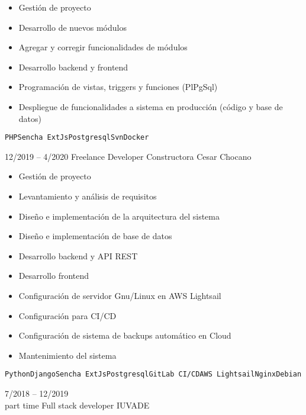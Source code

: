 \begin{entrylist}
{\begin{itemize}
    	        \item Gestión de proyecto
    	        \item Desarrollo de nuevos módulos
    	        \item Agregar y corregir funcionalidades de módulos
    	        \item Desarrollo backend y frontend
    	        \item Programación de vistas, triggers y funciones (PlPgSql)
    	        \item Despliegue de funcionalidades a sistema en producción (código y base de datos)
    	    \end{itemize}
		    \texttt{PHP}\slashsep\texttt{Sencha ExtJs}\slashsep\texttt{Postgresql}\slashsep\texttt{Svn}\slashsep\texttt{Docker}
        }
    \entry
		{12/2019 -- 4/2020}
		{Freelance Developer}
		{Constructora Cesar Chocano}
		{
		    \vspace{-5mm}
    	    \begin{itemize}
    	        \setlength\itemsep{0pt}
    	        \setlength\parskip{0pt}
    	        \item Gestión de proyecto
    	        \item Levantamiento y análisis de requisitos
    	        \item Diseño e implementación de la arquitectura del sistema
    	        \item Diseño e implementación de base de datos
    	        \item Desarrollo backend y API REST
    	        \item Desarrollo frontend
    	        \item Configuración de servidor Gnu/Linux en AWS Lightsail
    	        \item Configuración para CI/CD
    	        \item Configuración de sistema de backups automático en Cloud
    	        \item Mantenimiento del sistema
    	    \end{itemize}
		    \texttt{Python}\slashsep\texttt{Django}\slashsep\texttt{Sencha ExtJs}\slashsep\texttt{Postgresql}\slashsep\texttt{GitLab CI/CD}\slashsep\texttt{AWS Lightsail}\slashsep\texttt{Nginx}\slashsep\texttt{Debian}
        }
	\entry
		{7/2018 -- 12/2019\\\footnotesize{part time}}
		{Full stack developer}
		{IUVADE}
		{
		    \vspace{-5mm}
    	    \begin{itemize}

\end{itemize}}
\end{entrylist}
